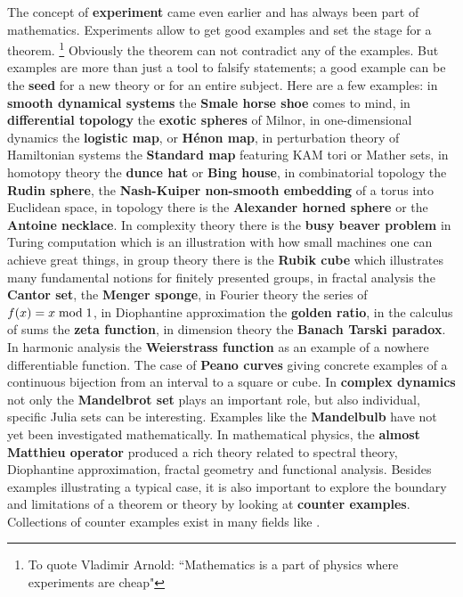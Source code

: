 \documentclass[12pt]{amsart}
\newcounter{example}    \def\example#1{ \item \fontsize{12}{15} \selectfont #1 \fontsize{12}{15} \selectfont }
\begin{document}
The concept of {\bf experiment} came even earlier and has always been part of mathematics. Experiments
allow to get good examples and set the stage for a theorem. 
\footnote{To quote Vladimir Arnold: ``Mathematics is a part of physics where experiments are cheap"}
Obviously the theorem can not contradict
any of the examples. But examples are more than just a tool to falsify statements;
a good example can be the {\bf seed} for a new theory or for an entire subject. 
Here are a few examples: in {\bf smooth dynamical systems} the {\bf Smale horse shoe} comes to mind,
in {\bf differential topology} the {\bf exotic spheres} of Milnor, in one-dimensional dynamics 
the {\bf logistic map}, or {\bf H\'enon map}, in perturbation theory of Hamiltonian systems the {\bf Standard map} featuring
KAM tori or Mather sets, in homotopy theory the {\bf dunce hat} or {\bf Bing house}, 
in combinatorial topology the {\bf Rudin sphere}, the {\bf Nash-Kuiper non-smooth embedding} of a torus into Euclidean space,
in topology there is the {\bf Alexander horned sphere} or the {\bf Antoine necklace}. In complexity theory there is 
the {\bf busy beaver problem} in Turing computation which is an illustration with how small machines one can achieve great things,
in group theory there is the {\bf Rubik cube} which illustrates many fundamental notions for finitely presented groups, 
in fractal analysis the {\bf Cantor set}, the {\bf Menger sponge}, 
in Fourier theory the series of $f(x)=x \; {\rm mod} \; 1$, 
in Diophantine approximation the {\bf golden ratio}, in the calculus of sums the {\bf zeta function}, in 
dimension theory the {\bf Banach Tarski paradox}. In harmonic analysis the {\bf Weierstrass function} 
as an example of a nowhere differentiable function. The case of {\bf Peano curves} giving concrete examples of
a continuous bijection from an interval to a square or cube. In {\bf complex dynamics} not only 
the {\bf Mandelbrot set} plays an important role, but also individual, specific Julia sets can be interesting.
Examples like the {\bf Mandelbulb} have not yet been investigated mathematically.
In mathematical physics, the {\bf almost Matthieu operator} \cite{Cycon} produced a rich theory related to 
spectral theory, Diophantine approximation, fractal geometry and functional analysis. 
Besides examples illustrating a typical case, it is also important to explore the boundary and limitations 
of a theorem or theory by looking at {\bf counter examples}. Collections of counter examples exist in many fields like
\cite{GelbaumOlmsted,SteenSeebach,RajwadeBhandari,Stoyanov,WiseHall,CapobiancoMolluzzo,Klymchuk}.
\end{document}
